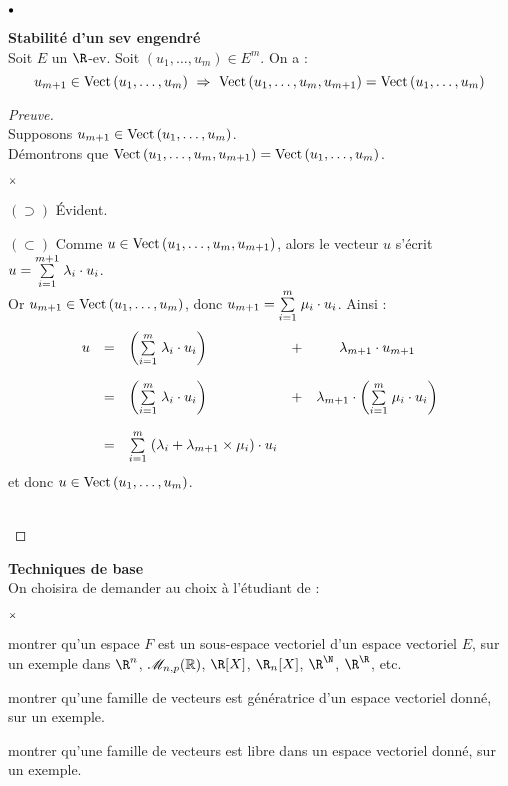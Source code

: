 \documentclass[11pt]{article}%
\begin{document}
\begin{noliste}{$\scriptstyle \bullet$}
  \item {\bf Stabilité d'un sev engendré}\\
  Soit $E$ un $\R$-ev. Soit $(u_1,\hdots,u_m)\in E^m$. On a :
  \[
   u_{m+1} \in\Vect{u_1,\hdots, u_m} \ \Rightarrow \ \Vect{u_1,
   \hdots, u_m,u_{m+1}} = \Vect{u_1,\hdots, u_m}
  \]
  
  \begin{proof}[Preuve]~\\
  Supposons $u_{m+1}\in{\rm{Vect}}\left(u_1,\hdots, u_m\right)$.\\
  Démontrons que ${\rm{Vect}}\left(u_1,\hdots, u_m,u_{m+1}\right)={\rm{Vect}}\left(u_1,
  \hdots,u_m\right)$.
  \begin{noliste}{$\scriptstyle \times$}
  \item $(\supset)$ Évident.
  
  \item $(\subset)$ Comme $u\in {\rm{Vect}}\left(u_1,\hdots,u_m,u_{m+1}\right)$, alors 
  le 
  vecteur $u$ s'écrit $u={\textstyle\sum\limits_{i=1}^{m+1}}\hspace{.1cm} \lambda_i \cdot u_i$.\\
  Or $u_{m+1}\in{\rm{Vect}}\left(u_1,\hdots,u_m\right)$, donc $u_{m+1}={\textstyle\sum\limits_{i=1}^{m}}\hspace{.1cm} 
  \mu_i \cdot u_i$. Ainsi :
  \[
    \begin{array}{rclcc}
    u &=& \left({\textstyle\sum\limits_{i=1}^{m}}\hspace{.1cm} \lambda_i \cdot u_i\right) & + & 
    \lambda_{m+1} \cdot u_{m+1}
    \\[.6cm]
    &=& \left({\textstyle\sum\limits_{i=1}^{m}}\hspace{.1cm} \lambda_i \cdot u_i\right) & + & 
    \lambda_{m+1} \cdot \left( {\textstyle\sum\limits_{i=1}^{m}}\hspace{.1cm} \mu_i \cdot u_i\right)
    \\[.6cm]
    &=& {\textstyle\sum\limits_{i=1}^{m}}\hspace{.1cm} (\lambda_i+\lambda_{m+1} \times \mu_i) \cdot u_i
    \end{array}
  \]
  et donc $u\in{\rm{Vect}}\left(u_1,\hdots,u_m\right)$.
  \end{noliste}~\\[-1cm]
  \end{proof}
  
  \item {\bf Techniques de base}\\
  On choisira de demander au choix à l'étudiant de :
  \begin{noliste}{$\scriptstyle \times$}
    \item montrer qu'un espace $F$ est un sous-espace 
    vectoriel d'un espace vectoriel $E$, sur un exemple dans $\R^n$, 
    $\mathscr{M}_{n,p}(\mathbb{R})$, $\R[X]$, $\R_n[X]$, $\R^\N$, $\R^\R$, etc.
    \item montrer qu'une famille de vecteurs est génératrice d'un 
    espace vectoriel donné, sur un exemple.
    \item montrer qu'une famille de vecteurs est libre dans un 
    espace vectoriel donné, sur un exemple.
  \end{noliste}
  

\end{noliste}
\end{document}
